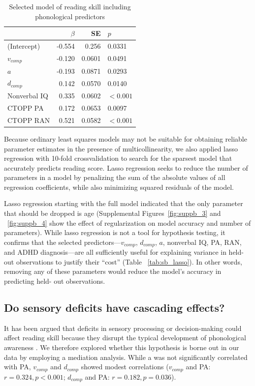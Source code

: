 \documentclass[../uwthesis.tex]{subfiles}
\begin{document}
\begin{table}
\caption{Selected model of reading skill including phonological predictors}
\label{tab:p3_full_model}
\centering
    \begin{tabular}{lrrl}
    \toprule
      & $\beta$ & SE & $p$\\
    \midrule
    (Intercept) & -0.554 & 0.256 & 0.0331\\
    $v_{comp}$ & -0.120 & 0.0601 & 0.0491\\
    $a$ & -0.193 & 0.0871 & 0.0293 \\
    $d_{comp}$ & 0.142 & 0.0570 & 0.0140\\
    Nonverbal IQ & 0.335 & 0.0602 & $<0.001$\\
    CTOPP PA & 0.172 & 0.0653 & 0.0097 \\
    CTOPP RAN & 0.521 & 0.0582 & $<0.001$\\
    \bottomrule
    \end{tabular}
\end{table}

Because ordinary least squares models may not be suitable for obtaining reliable parameter estimates in the presence of multicollinearity, we also applied lasso regression with 10-fold crossvalidation \citep{Friedman2010RegularizationDescent.} to search for the sparsest model that accurately predicts reading score. Lasso regression seeks to reduce the number of parameters in a model by penalizing the sum of the absolute values of all regression coefficients, while also minimizing squared residuals of the
model.

Lasso regression starting with the full model indicated that the only parameter that should be dropped is age (Supplemental Figures~\ref{fig:suppb_3} and ~\ref{fig:suppb_4} show the effect of regularization on model accuracy and number of parameters). While lasso regression is not a tool for hypothesis testing, it confirms that the selected predictors---$v_{comp}$, $d_{comp}$, $a$, nonverbal IQ, PA, RAN, and ADHD diagnosis---are all sufficiently useful for explaining variance in held-out observations to justify their “cost” (Table ~\ref{tab:sb_lasso}). In other words, removing any of these parameters would reduce the model’s accuracy in predicting held-
out observations.

\subsection{Do sensory deficits have cascading effects?}
It has been argued that deficits in sensory processing or decision-making could affect reading skill because they disrupt the typical development of phonological awareness 
\citep{Lieder2019PerceptualDyslexia,Manis1997,Richardson2004}. We
therefore explored whether this hypothesis is borne out in our data by employing a mediation analysis. While a was not significantly correlated with PA, $v_{comp}$ and $d_{comp}$ showed modest correlations ($v_{comp}$ and PA: $r = 0.324, p < 0.001$; $d_{comp}$ and PA: $r = 0.182, p = 0.036$).
\end{document}
